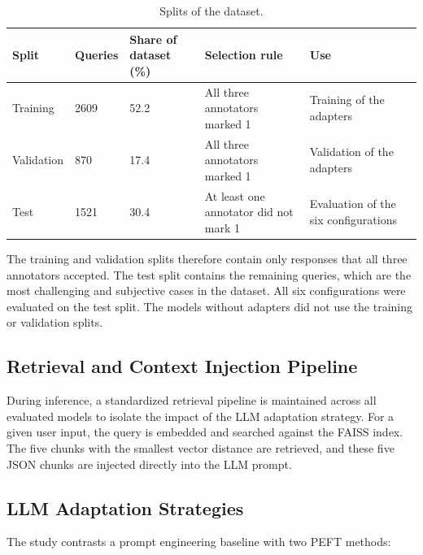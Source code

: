\documentclass[journal,article,submit,pdftex,moreauthors]{Definitions/mdpi}
\begin{document}
\begin{table}[H]
\caption{Splits of the dataset.}\label{tab:splits}
\begin{tabularx}{\textwidth}{lCCXX}
\toprule
Split & Queries & Share of dataset (\%) & Selection rule & Use\\
\midrule
Training & 2609 & 52.2 & All three annotators marked 1 & Training of the adapters\\
Validation & 870 & 17.4 & All three annotators marked 1 & Validation of the adapters\\
Test & 1521 & 30.4 & At least one annotator did not mark 1 & Evaluation of the six configurations\\
\bottomrule
\end{tabularx}
\end{table}

The training and validation splits therefore contain only responses that all three annotators accepted. The test split contains the remaining queries, which are the most challenging and subjective cases in the dataset. All six configurations were evaluated on the test split. The models without adapters did not use the training or validation splits.

\subsection{Retrieval and Context Injection Pipeline}
During inference, a standardized retrieval pipeline is maintained across all evaluated models to isolate the impact of the LLM adaptation strategy. For a given user input, the query is embedded and searched against the FAISS index. The five chunks with the smallest vector distance are retrieved, and these five JSON chunks are injected directly into the LLM prompt.

\subsection{LLM Adaptation Strategies}
The study contrasts a prompt engineering baseline with two PEFT methods:
\end{document}
